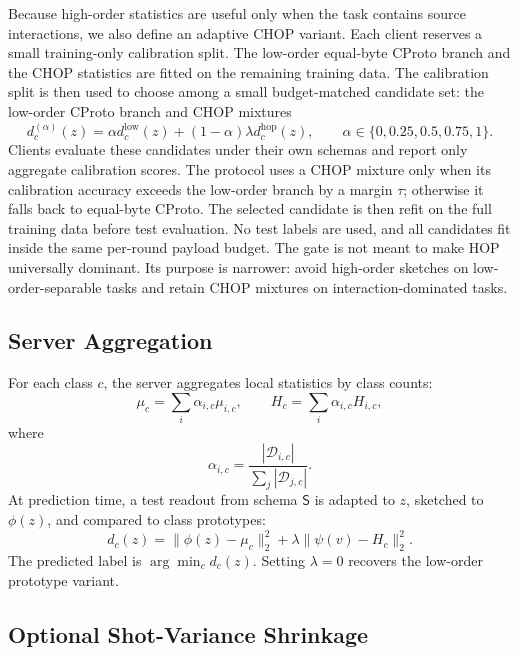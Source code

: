 \documentclass[preprint]{elsarticle}
\newcommand{\schema}{\mathsf{S}}
\newcommand{\cD}{\mathcal{D}}
\begin{document}
Because high-order statistics are useful only when the task contains source interactions, we also define an adaptive CHOP variant. Each client reserves a small training-only calibration split. The low-order equal-byte CProto branch and the CHOP statistics are fitted on the remaining training data. The calibration split is then used to choose among a small budget-matched candidate set: the low-order CProto branch and CHOP mixtures
\begin{equation}
    d_c^{(\alpha)}(z)=
    \alpha d^{\mathrm{low}}_c(z)
    +(1-\alpha)\lambda d^{\mathrm{hop}}_c(z),
    \qquad
    \alpha\in\{0,0.25,0.5,0.75,1\}.
\end{equation}
Clients evaluate these candidates under their own schemas and report only aggregate calibration scores. The protocol uses a CHOP mixture only when its calibration accuracy exceeds the low-order branch by a margin \(\tau\); otherwise it falls back to equal-byte CProto. The selected candidate is then refit on the full training data before test evaluation. No test labels are used, and all candidates fit inside the same per-round payload budget. The gate is not meant to make HOP universally dominant. Its purpose is narrower: avoid high-order sketches on low-order-separable tasks and retain CHOP mixtures on interaction-dominated tasks.

\subsection{Server Aggregation}

For each class \(c\), the server aggregates local statistics by class counts:
\begin{equation}
    \mu_c = \sum_i \alpha_{i,c}\mu_{i,c},\qquad
    H_c = \sum_i \alpha_{i,c}H_{i,c},
\end{equation}
where
\begin{equation}
    \alpha_{i,c}=
    \frac{|\cD_{i,c}|}{\sum_j |\cD_{j,c}|}.
\end{equation}
At prediction time, a test readout from schema \(\schema\) is adapted to \(z\), sketched to \(\phi(z)\), and compared to class prototypes:
\begin{equation}
    d_c(z)=
    \|\phi(z)-\mu_c\|_2^2
    + \lambda \|\psi(v)-H_c\|_2^2.
\end{equation}
The predicted label is \(\arg\min_c d_c(z)\). Setting \(\lambda=0\) recovers the low-order prototype variant.

\subsection{Optional Shot-Variance Shrinkage}
\end{document}
